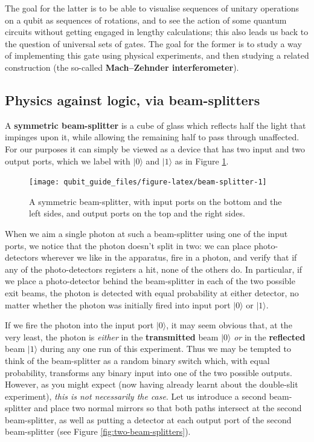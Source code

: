 \documentclass[fleqn,a4paper]{article}
\theoremstyle{definition}
\theoremstyle{definition}
\theoremstyle{definition}
\theoremstyle{definition}
\theoremstyle{remark}
\begin{document}
The goal for the latter is to be able to visualise sequences of unitary operations on a qubit as sequences of rotations, and to see the action of some quantum circuits without getting engaged in lengthy calculations; this also leads us back to the question of universal sets of gates.
The goal for the former is to study a way of implementing this gate using physical experiments, and then studying a related construction (the so-called \textbf{Mach--Zehnder interferometer}).

\hypertarget{beamsplitters-against-logic}{%
\subsection{Physics against logic, via beam-splitters}\label{beamsplitters-against-logic}}

A \textbf{symmetric beam-splitter} is a cube of glass which reflects half the light that impinges upon it, while allowing the remaining half to pass through unaffected.
For our purposes it can simply be viewed as a device that has two input and two output ports, which we label with \(|0\rangle\) and \(|1\rangle\) as in Figure \ref{fig:beam-splitter}.

\begin{figure}[H]

{\centering \texttt{[image: qubit\_guide\_files/figure-latex/beam-splitter-1]} 

}

\caption{A symmetric beam-splitter, with input ports on the bottom and the left sides, and output ports on the top and the right sides.}\label{fig:beam-splitter}
\end{figure}

When we aim a single photon at such a beam-splitter using one of the input ports, we notice that the photon doesn't split in two: we can place photo-detectors wherever we like in the apparatus, fire in a photon, and verify that if any of the photo-detectors registers a hit, none of the others do.
In particular, if we place a photo-detector behind the beam-splitter in each of the two possible exit beams, the photon is detected with equal probability at either detector, no matter whether the photon was initially fired into input port \(|0\rangle\) or \(|1\rangle\).

If we fire the photon into the input port \(|0\rangle\), it may seem obvious that, at the very least, the photon is \emph{either} in the \textbf{transmitted} beam \(|0\rangle\) \emph{or} in the \textbf{reflected} beam \(|1\rangle\) during any one run of this experiment.
Thus we may be tempted to think of the beam-splitter as a random binary switch which, with equal probability, transforms any binary input into one of the two possible outputs.
However, as you might expect (now having already learnt about the double-slit experiment), \emph{this is not necessarily the case}.
Let us introduce a second beam-splitter and place two normal mirrors so that both paths intersect at the second beam-splitter, as well as putting a detector at each output port of the second beam-splitter (see Figure \ref{fig:two-beam-splitters}).
\end{document}
